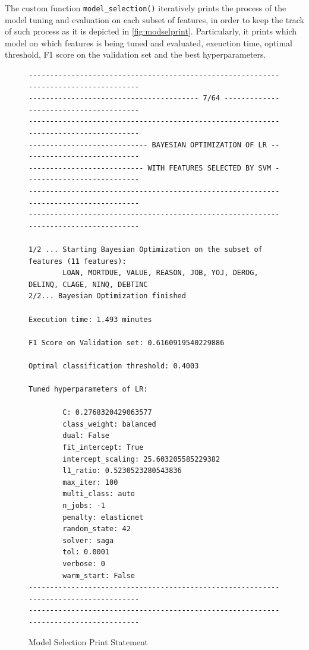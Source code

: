 The custom function \lstinline{model_selection()} iteratively prints the process of the model tuning and evaluation on each subset of features, in order to keep the track of such process as it is depicted in \autoref{fig:modselprint}.
Particularly, it prints which model on which features is being tuned and evaluated, exeuction time, optimal threshold, F1 score on the validation set and the best hyperparameters.

\begin{figure}[H]
\centering\caption{Model Selection Print Statement}
\label{fig:modselprint}

{\fontsize{8.8}{11}\selectfont 
\begin{verbatim}
-------------------------------------------------------------------------------------
---------------------------------------- 7/64 ---------------------------------------
-------------------------------------------------------------------------------------
---------------------------- BAYESIAN OPTIMIZATION OF LR ----------------------------
--------------------------- WITH FEATURES SELECTED BY SVM ---------------------------
-------------------------------------------------------------------------------------
------------------------------------------------------------------------------------- 

1/2 ... Starting Bayesian Optimization on the subset of features (11 features):
        LOAN, MORTDUE, VALUE, REASON, JOB, YOJ, DEROG, DELINQ, CLAGE, NINQ, DEBTINC
2/2... Bayesian Optimization finished 

Execution time: 1.493 minutes 

F1 Score on Validation set: 0.6160919540229886 

Optimal classification threshold: 0.4003

Tuned hyperparameters of LR: 

        C: 0.2768320429063577
        class_weight: balanced
        dual: False
        fit_intercept: True
        intercept_scaling: 25.603205585229382
        l1_ratio: 0.5230523280543836
        max_iter: 100
        multi_class: auto
        n_jobs: -1
        penalty: elasticnet
        random_state: 42
        solver: saga
        tol: 0.0001
        verbose: 0
        warm_start: False
-------------------------------------------------------------------------------------
-------------------------------------------------------------------------------------
\end{verbatim}
}
\vspace{0em}
\end{figure}


